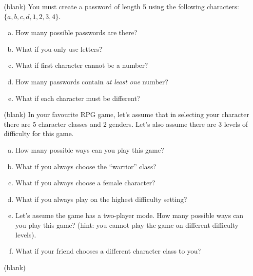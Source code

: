 \documentclass[a4paper,12pt]{article}
\begin{document}
\newpage
(blank)
\newpage
You must create a password of length 5 using the following characters:
$\{a,b,c,d,1,2,3,4\}$.\\[-0.2cm]
\begin{enumerate}[(a)]
\item How many possible passwords are there? \item What if you only use letters? \item What if first character cannot be a number? \item How many passwords contain 
\emph{at least one} number? \item What if each character must be different?
\end{enumerate}
\newpage
(blank)
\newpage
In your favourite RPG game, let's assume that in selecting your character there are 5 character classes and 2 genders. Let's also assume there are 3 levels of difficulty for this game.\\[-0.2cm]
\begin{enumerate}[(a)]
\item How many possible ways can you play this game? \item What if you always choose the ``warrior'' class? \item What if you always choose a female character? \item What if you always play on the highest difficulty setting? \item Let's assume the game has a two-player mode. How many possible ways can you play this game? (hint: you cannot play the game on different difficulty levels). \item What if your friend chooses a different character class to you?
\end{enumerate}
\newpage
(blank)
\newpage
\end{document}
